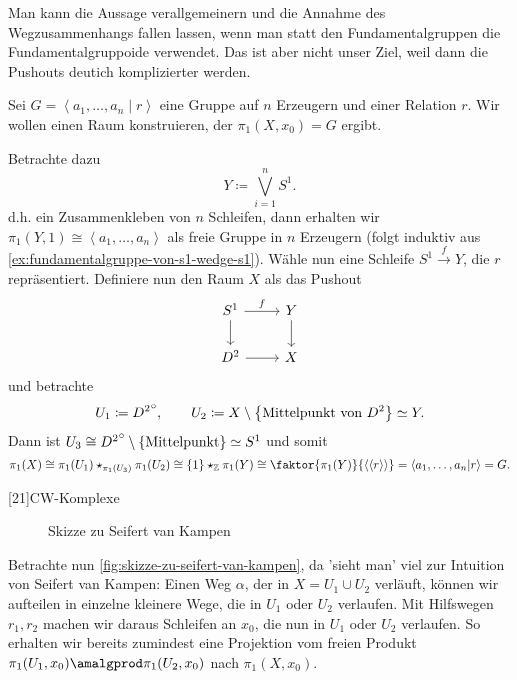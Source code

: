 \begin{oral}
    Man kann die Aussage verallgemeinern und die Annahme des Wegzusammenhangs fallen lassen, wenn man statt den Fundamentalgruppen die Fundamentalgruppoide verwendet. Das ist aber nicht unser Ziel, weil dann die Pushouts deutich komplizierter werden.
\end{oral}

\begin{example}
    Sei $G = \left< a_1,\ldots,a_n\mid r \right> $ eine Gruppe auf $n$ Erzeugern und einer Relation  $r$. Wir wollen einen Raum konstruieren, der  $\pi_1(X,x_0) = G$ ergibt.

    Betrachte dazu
    \[
    Y \coloneqq  \bigvee_{i=1}^{n} S^1
    .\] 
    d.h. ein Zusammenkleben von $n$ Schleifen, dann erhalten wir $\pi_1(Y,1) \cong \left< a_1,\ldots,a_n \right> $ als freie Gruppe in $n$ Erzeugern (folgt induktiv aus \autoref{ex:fundamentalgruppe-von-s1-wedge-s1}). Wähle nun eine Schleife $S^1 \stackrel{f}{\longrightarrow} Y$, die $r$ repräsentiert. Definiere nun den Raum  $X$ als das Pushout
     \[
    \begin{tikzcd}
        S^1 \ar[swap]{d}{} \ar{r}{f} & Y \ar{d}{} \\
        D^2 \ar[swap]{r}{} & X
    \end{tikzcd}
    \]
   und betrachte
   \[
       U_1 \coloneqq  {D^2}^\circ, \qquad U_2\coloneqq X \setminus \left \{\text{Mittelpunkt von $D^2$}\right\} \simeq Y
   .\] 
   Dann ist $U_3 \cong {D^2}^\circ \setminus \left \{\text{Mittelpunkt}\right\} \simeq S^1$ und somit
   \[
       \pi_1(X) \cong \pi_1(U_1) \star_{\pi_1(U_3)} \pi_1(U_2) \cong \left \{1\right\} \star_{\mathbb{Z}} \pi_1(Y) \cong \faktor{\pi_1(Y)}{\left< \left< r \right>  \right> } = \left< a_1,\ldots,a_n|r \right>  = G
   .\] 
\end{example}

[21]{CW-Komplexe}

\begin{figure}[ht]
    \centering
    \caption{Skizze zu Seifert van Kampen}
    \label{fig:skizze-zu-seifert-van-kampen}
\end{figure}

Betrachte nun \autoref{fig:skizze-zu-seifert-van-kampen}, da 'sieht man' viel zur Intuition von Seifert van Kampen: Einen Weg $α$, der in  $X = U_1 \cup U_2$ verläuft, können wir aufteilen in einzelne kleinere Wege, die in $U_1$ oder $U_2$ verlaufen. Mit Hilfswegen $r_1,r_2$ machen wir daraus Schleifen an $x_0$, die nun in $U_1$ oder $U_2$ verlaufen. So erhalten wir bereits zumindest eine Projektion vom freien Produkt $\pi_1(U_1,x_0) \amalgprod  \pi_1(U_2, x_0)$ nach $\pi_1(X,x_0)$.

